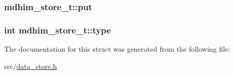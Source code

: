 \hypertarget{structmdhim__store__t_a5a33c9ea5897fdf71a54573ea49fef18}{
\subsubsection[{put}]{ mdhim\-\_\-store\-\_\-t\-::put}}\label{structmdhim__store__t_a5a33c9ea5897fdf71a54573ea49fef18}
\hypertarget{structmdhim__store__t_a00f8694bd01cc8cfda7479b7384e083b}{
\subsubsection[{type}]{\setlength{\rightskip}{0pt plus 5cm}int mdhim\-\_\-store\-\_\-t\-::type}}\label{structmdhim__store__t_a00f8694bd01cc8cfda7479b7384e083b}


The documentation for this struct was generated from the following file\-:\begin{DoxyCompactItemize}
\item 
src/\hyperlink{data__store_8h}{data\-\_\-store.\-h}\end{DoxyCompactItemize}
